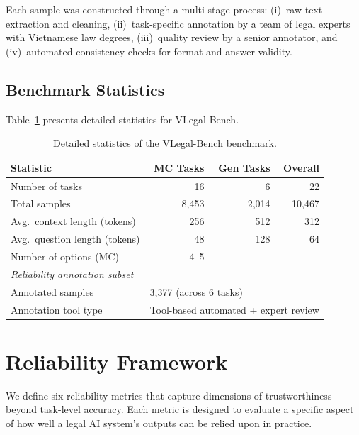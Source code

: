 \documentclass[11pt,a4paper]{article}
\newcommand{\system}{VLegal-Bench}
\begin{document}
Each sample was constructed through a multi-stage process: (i)~raw text extraction and cleaning, (ii)~task-specific annotation by a team of legal experts with Vietnamese law degrees, (iii)~quality review by a senior annotator, and (iv)~automated consistency checks for format and answer validity.

\subsection{Benchmark Statistics}

Table~\ref{tab:benchmark_stats} presents detailed statistics for \system{}.

\begin{table}[htbp]
\centering
\caption{Detailed statistics of the \system{} benchmark.}
\label{tab:benchmark_stats}
\begin{tabular}{@{}lrrr@{}}
\toprule
\textbf{Statistic} & \textbf{MC Tasks} & \textbf{Gen Tasks} & \textbf{Overall} \\
\midrule
Number of tasks & 16 & 6 & 22 \\
Total samples & 8{,}453 & 2{,}014 & 10{,}467 \\
Avg.\ context length (tokens) & 256 & 512 & 312 \\
Avg.\ question length (tokens) & 48 & 128 & 64 \\
Number of options (MC) & 4--5 & --- & --- \\
\midrule
\multicolumn{4}{l}{\textit{Reliability annotation subset}} \\
Annotated samples & \multicolumn{3}{l}{3{,}377 (across 6 tasks)} \\
Annotation tool type & \multicolumn{3}{l}{Tool-based automated + expert review} \\
\bottomrule
\end{tabular}
\end{table}

\section{Reliability Framework}
\label{sec:reliability}

We define six reliability metrics that capture dimensions of trustworthiness beyond task-level accuracy. Each metric is designed to evaluate a specific aspect of how well a legal AI system's outputs can be relied upon in practice.
\end{document}
